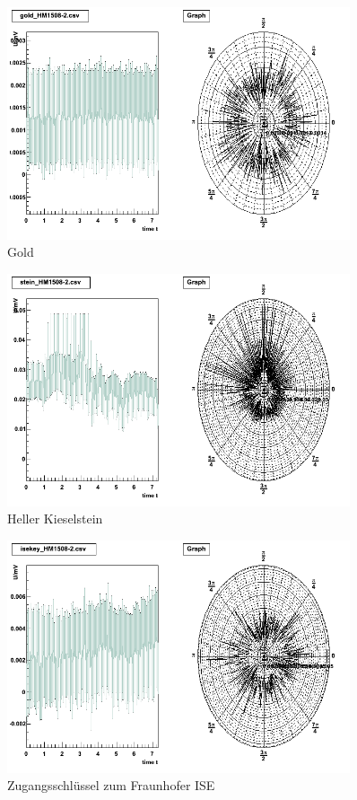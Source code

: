 \begin{appendix}
\begin{figure}[H]
	\centering \includegraphics[width=0.9\textwidth]{Auswertung/Proben-polar/gold.png}
	\caption{Gold}
\end{figure}

\begin{figure}[H]
	\centering \includegraphics[width=0.9\textwidth]{Auswertung/Proben-polar/stein.png}
	\caption{Heller Kieselstein}
\end{figure}

\begin{figure}[H]
	\centering \includegraphics[width=0.9\textwidth]{Auswertung/Proben-polar/isekey.png}
	\caption{Zugangsschlüssel zum Fraunhofer ISE}
\end{figure}


\end{appendix}
